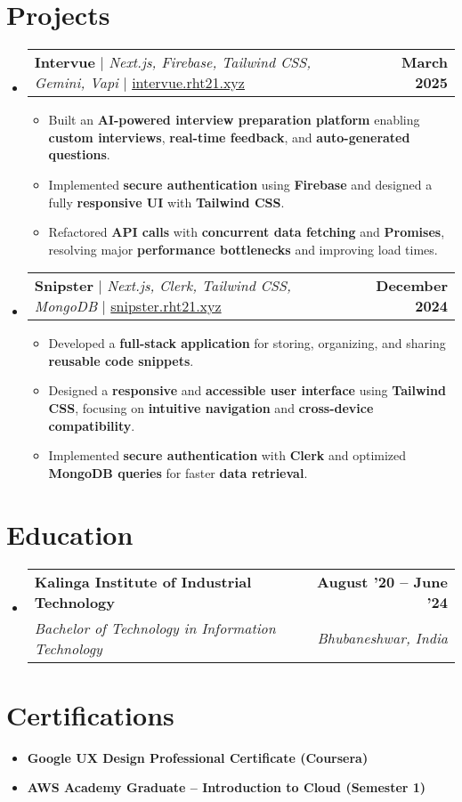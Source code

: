 \documentclass[letterpaper,11pt]{article}
\makeatletter
\newcommand{\resumeItem}[1]{
  \item\small{
    {#1 \vspace{-2pt}}
  }
}
\newcommand{\resumeSubheading}[4]{
  \vspace{-2pt}\item
    \begin{tabular*}{1.0\textwidth}[t]{l@{\extracolsep{\fill}}r}
      \textbf{#1} & \textbf{\small #2} \\
      \textit{\small#3} & \textit{\small #4} \\
    \end{tabular*}\vspace{-7pt}
}
\newcommand{\resumeProjectHeading}[2]{
    \item
    \begin{tabular*}{1.001\textwidth}{l@{\extracolsep{\fill}}r}
      \small#1 & \textbf{\small #2} \\
    \end{tabular*}\vspace{-7pt}
}
\newcommand{\resumeSubHeadingListStart}{\begin{itemize}[leftmargin=0.0in, label={}]}
\newcommand{\resumeSubHeadingListEnd}{\end{itemize}}
\newcommand{\resumeItemListStart}{\raggedright \begin{itemize} \vspace{0pt}}
\newcommand{\resumeItemListEnd}{\end{itemize}\vspace{-1pt}}
\makeatother
\begin{document}
\vspace{-16pt}

\section{Projects}
    \vspace{-2pt}
    \resumeSubHeadingListStart
        \resumeProjectHeading
            {\textbf{Intervue} $|$ \emph{Next.js, Firebase, Tailwind CSS, Gemini, Vapi}  $|$ \href{https://intervue.rht21.xyz}{intervue.rht21.xyz}}{March 2025}
            \vspace{-8pt}
            \resumeItemListStart
              \resumeItem{Built an \textbf{AI-powered interview preparation platform} enabling \textbf{custom interviews}, \textbf{real-time feedback}, and \textbf{auto-generated questions}.}
              \resumeItem{Implemented \textbf{secure authentication} using \textbf{Firebase} and designed a fully \textbf{responsive UI} with \textbf{Tailwind CSS}.}
              \resumeItem{Refactored \textbf{API calls} with \textbf{concurrent data fetching} and \textbf{Promises}, resolving major \textbf{performance bottlenecks} and improving load times.}
            \resumeItemListEnd
        \vspace{-16pt}
        \resumeProjectHeading
            {\textbf{Snipster} $|$ \emph{Next.js, Clerk, Tailwind CSS, MongoDB}  $|$ \href{https://snipster.rht21.xyz}{snipster.rht21.xyz}}{December 2024}
            \vspace{-8pt}
            \resumeItemListStart
              \resumeItem{Developed a \textbf{full-stack application} for storing, organizing, and sharing \textbf{reusable code snippets}.}
              \resumeItem{Designed a \textbf{responsive} and \textbf{accessible user interface} using \textbf{Tailwind CSS}, focusing on \textbf{intuitive navigation} and \textbf{cross-device compatibility}.}
              \resumeItem{Implemented \textbf{secure authentication} with \textbf{Clerk} and optimized \textbf{MongoDB queries} for faster \textbf{data retrieval}.}
            \resumeItemListEnd
    \resumeSubHeadingListEnd

\vspace{-16pt}

\section{Education}
  \resumeSubHeadingListStart
    \resumeSubheading
      {Kalinga Institute of Industrial Technology}{August '20 -- June '24}
      {Bachelor of Technology in Information Technology}{Bhubaneshwar, India}
  \resumeSubHeadingListEnd

\section{Certifications}
\resumeItemListStart
  \resumeItem{\textbf{Google UX Design Professional Certificate (Coursera)}}
  \resumeItem{\textbf{AWS Academy Graduate – Introduction to Cloud (Semester 1)}}
\resumeItemListEnd
\end{document}
